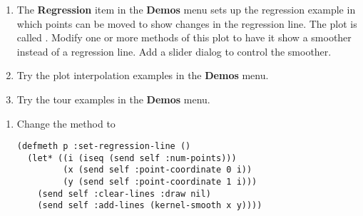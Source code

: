 \newpage
{}
\begin{enumerate}
\item
The {\bf Regression} item in the {\bf Demos} menu sets up the
regression example in which points can be moved to show changes in the
regression line. The plot is called . Modify one or more
methods of this plot to have it show a smoother instead of a
regression line. Add a slider dialog to control the smoother.
\item
Try the plot interpolation examples in the {\bf Demos} menu.
\item
Try the tour examples in the {\bf Demos} menu.
\end{enumerate}

\newpage
{}
\begin{enumerate}
\item
Change the  method to
\begin{verbatim}
(defmeth p :set-regression-line ()
  (let* ((i (iseq (send self :num-points)))
         (x (send self :point-coordinate 0 i))
         (y (send self :point-coordinate 1 i)))
    (send self :clear-lines :draw nil)
    (send self :add-lines (kernel-smooth x y))))
\end{verbatim}


\end{enumerate}

